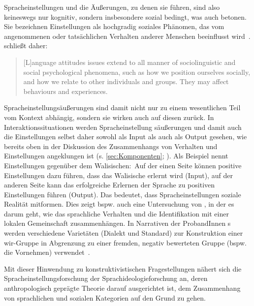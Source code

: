 Spracheinstellungen %
und die Äußerungen, zu denen sie führen, %
sind also keineswegs nur kognitiv, sondern insbesondere sozial bedingt, was auch \citet{Aronson.2014} betonen. 
Sie bezeichnen Einstellungen als {\glqq}hochgradig soziales Ph{\"a}nomen, das vom angenommenen oder tats{\"a}chlichen Verhalten anderer Menschen beeinflusst wird{\grqq}~\citep[223]{Aronson.2014}. 
\citet{Garrett.2012} schließt daher:
\begin{quote}[L]anguage attitudes issues extend to all manner of sociolinguistic and social psychological phenomena, such as how we position ourselves socially, and how we relate to other individuals and groups. They may affect behaviours and experiences.~\citep[15]{Garrett.2012}\end{quote}
Spracheinstellungsäußerungen sind damit nicht nur zu einem wesentlichen Teil vom Kontext abhängig, sondern sie wirken auch auf diesen zurück. 
In Interaktionssituationen werden Spracheinstellung%
säußerungen und damit auch die Einstellungen selbst %
daher sowohl als Input als auch als Output gesehen, wie bereits oben in der Diskussion des Zusammenhangs von Verhalten und Einstellungen angeklungen ist (s. \autoref{sec:Komponenten}; \citealp[400]{Lasagabaster.2005}). 
Als Beispiel nennt \citet[21]{Garrett.2012} Einstellungen gegen{\"u}ber dem Walisischen:~Auf der einen Seite k{\"o}nnen positive Einstellungen dazu f{\"u}hren, dass das Walisische erlernt wird (Input), auf der anderen Seite kann das erfolgreiche Erlernen der Sprache zu positiven Einstellungen f{\"u}hren (Output). 
Das bedeutet, dass Spracheinstellungen soziale Realität mitformen. 
Dies zeigt bspw. auch eine Untersuchung von \citet{Keim.1995}, in der es darum geht, wie das sprachliche Verhalten und die Identifikation mit einer lokalen Gemeinschaft zusammenhängen. 
In Narrativen der ProbandInnen \citeauthor{Keim.1995}s werden verschiedene Variet{\"a}ten (Dialekt und Standard) zur Konstruktion einer wir-Gruppe in Abgrenzung zu einer fremden, negativ bewerteten Gruppe (bspw. die Vornehmen) verwendet~\citep[s.][170]{Keim.1995}.

Mit dieser Hinwendung zu konstruktivistischen Fragestellungen nähert sich die Spracheinstellungsforschung der Sprachideologieforschung an, deren anthropologisch geprägte Theorie darauf ausgerichtet ist, dem Zusammenhang von sprachlichen und sozialen Kategorien auf den Grund zu gehen. 
